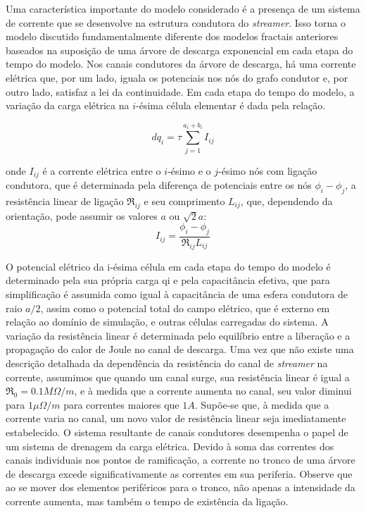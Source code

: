 \documentclass[a4paper, 12pt, onecolumn,singlespacing]{article}
\begin{document}
	Uma característica importante do modelo considerado é a presença de um sistema de corrente que se desenvolve na estrutura condutora do \textit{streamer}. Isso torna o modelo discutido fundamentalmente diferente dos modelos fractais anteriores baseados na suposição de uma árvore de descarga exponencial em cada etapa do tempo do modelo. Nos canais condutores da árvore de descarga, há uma corrente elétrica que, por um lado, iguala os potenciais nos nós do grafo condutor e, por outro lado, satisfaz a lei da continuidade. Em cada etapa do tempo do modelo, a variação da carga elétrica na $i$-ésima célula elementar é dada pela relação.
	
	\begin{equation}
		dq_i = \tau \sum_{j=1}^{a_i + b_i} I_{ij} 
		\label{eqn_2}
	\end{equation}

	onde $I_{ij}$ é a corrente elétrica entre o $i$-ésimo e o $j$-ésimo nós com ligação condutora, que é determinada pela diferença de potenciais entre os nós $\phi_i - \phi_j$, a resistência linear de ligação $\Re_{ij}$ e seu comprimento $L_{ij}$, que, dependendo da orientação, pode assumir os valores $a$ ou $\sqrt{2}a$:
	\begin{equation}
		I_{ij} = \frac{\phi_i - \phi_j}{\Re_{ij} L_{ij}}
		\label{eqn_3}
	\end{equation}
	
	O potencial elétrico da i-ésima célula em cada etapa do tempo do modelo é determinado pela sua própria carga qi e pela capacitância efetiva, que para simplificação é assumida como igual à capacitância de uma esfera condutora de raio $a/2$, assim como o potencial total do campo elétrico, que é externo em relação ao domínio de simulação, e outras células carregadas do sistema. A variação da resistência linear é determinada pelo equilíbrio entre a liberação e a propagação do calor de Joule no canal de descarga. Uma vez que não existe uma descrição detalhada da dependência da resistência do canal de \textit{streamer} na corrente, assumimos que quando um canal surge, sua resistência linear é igual a $\Re_{0} = 0.1 M\Omega/m$, e à medida que a corrente aumenta no canal, seu valor diminui para $1 \mu \Omega/m$ para correntes maiores que $1 A$. Supõe-se que, à medida que a corrente varia no canal, um novo valor de resistência linear seja imediatamente estabelecido. O sistema resultante de canais condutores desempenha o papel de um sistema de drenagem da carga elétrica. Devido à soma das correntes dos canais individuais nos pontos de ramificação, a corrente no tronco de uma árvore de descarga excede significativamente as correntes em sua periferia. Observe que ao se mover dos elementos periféricos para o tronco, não apenas a intensidade da corrente aumenta, mas também o tempo de existência da ligação.
	
\end{document}
